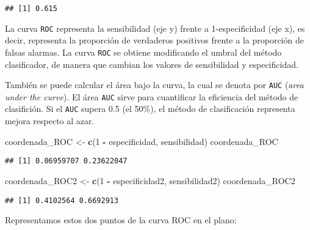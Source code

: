 \documentclass[
]{article}
\newenvironment{Shaded}{\begin{snugshade}}{\end{snugshade}}
\newcommand{\DecValTok}[1]{\textcolor[rgb]{0.00,0.00,0.81}{#1}}
\newcommand{\FunctionTok}[1]{\textcolor[rgb]{0.13,0.29,0.53}{\textbf{#1}}}
\newcommand{\NormalTok}[1]{#1}
\newcommand{\OtherTok}[1]{\textcolor[rgb]{0.56,0.35,0.01}{#1}}
\newcommand{\SpecialCharTok}[1]{\textcolor[rgb]{0.81,0.36,0.00}{\textbf{#1}}}
\begin{document}
\begin{verbatim}
## [1] 0.615
\end{verbatim}

La curva \texttt{ROC} representa la sensibilidad (eje y) frente a
1-especificidad (eje x), es decir, representa la proporción de
verdaderos positivos frente a la proporción de falsas alarmas. La curva
\texttt{ROC} se obtiene modificando el umbral del método clasificador,
de manera que cambian los valores de sensibilidad y especificidad.

También se puede calcular el área bajo la curva, la cual se denota por
\texttt{AUC} (\emph{area under the curve}). El área \texttt{AUC} sirve
para cuantificar la eficiencia del método de clasifición. Si el
\texttt{AUC} supera 0.5 (el 50\%), el método de clasificación representa
mejora respecto al azar.

\begin{Shaded}
\begin{Highlighting}[]
\NormalTok{coordenada\_ROC }\OtherTok{\textless{}{-}} \FunctionTok{c}\NormalTok{(}\DecValTok{1} \SpecialCharTok{{-}}\NormalTok{ especificidad, sensibilidad)}
\NormalTok{coordenada\_ROC}
\end{Highlighting}
\end{Shaded}

\begin{verbatim}
## [1] 0.06959707 0.23622047
\end{verbatim}

\begin{Shaded}
\begin{Highlighting}[]
\NormalTok{coordenada\_ROC2 }\OtherTok{\textless{}{-}} \FunctionTok{c}\NormalTok{(}\DecValTok{1} \SpecialCharTok{{-}}\NormalTok{ especificidad2, sensibilidad2)}
\NormalTok{coordenada\_ROC2}
\end{Highlighting}
\end{Shaded}

\begin{verbatim}
## [1] 0.4102564 0.6692913
\end{verbatim}

Representamos estos dos puntos de la curva ROC en el plano:
\end{document}
